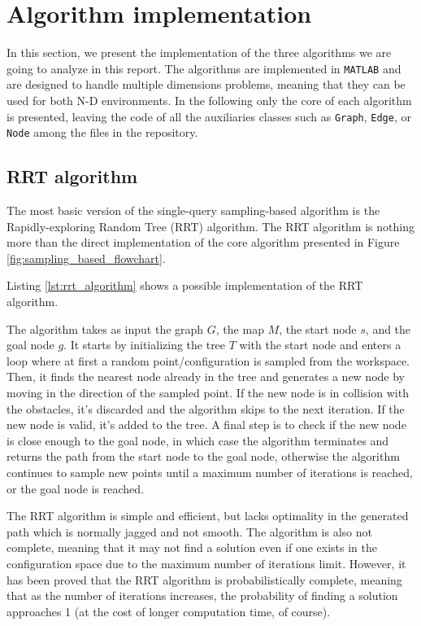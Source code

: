 \section{Algorithm implementation}
\label{sec:algorithm_implementation}

In this section, we present the implementation of the three algorithms we are going to analyze in this report.
The algorithms are implemented in \texttt{MATLAB} and are designed to handle multiple dimensions problems, meaning that they can be used for both N-D environments.
In the following only the core of each algorithm is presented, leaving the code of all the auxiliaries classes such as \texttt{Graph}, \texttt{Edge}, or \texttt{Node} among the files in the repository.


\subsection{RRT algorithm}
\label{subsec:rrt_algorithm}

The most basic version of the single-query sampling-based algorithm is the Rapidly-exploring Random Tree (RRT) algorithm.
The RRT algorithm is nothing more than the direct implementation of the core algorithm presented in Figure \ref{fig:sampling_based_flowchart}.

Listing \ref{lst:rrt_algorithm} shows a possible implementation of the RRT algorithm.




The algorithm takes as input the graph $G$, the map $M$, the start node $s$, and the goal node $g$.
It starts by initializing the tree $T$ with the start node and enters a loop where at first a random point/configuration is sampled from the workspace.
Then, it finds the nearest node already in the tree and generates a new node by moving in the direction of the sampled point.
If the new node is in collision with the obstacles, it's discarded and the algorithm skips to the next iteration.
If the new node is valid, it's added to the tree.
A final step is to check if the new node is close enough to the goal node, in which case the algorithm terminates and returns the path from the start node to the goal node, otherwise the algorithm continues to sample new points until a maximum number of iterations is reached, or the goal node is reached.

The RRT algorithm is simple and efficient, but lacks optimality in the generated path which is normally jagged and not smooth.
The algorithm is also not complete, meaning that it may not find a solution even if one exists in the configuration space due to the maximum number of iterations limit.
However, it has been proved that the RRT algorithm is probabilistically complete, meaning that as the number of iterations increases, the probability of finding a solution approaches 1 (at the cost of longer computation time, of course).



